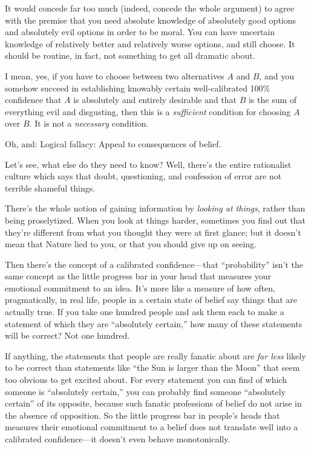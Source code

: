 {
 It would concede far too much (indeed, concede the whole argument)
to agree with the premise that you need absolute knowledge of
absolutely good options and absolutely evil options in order to be
moral. You can have uncertain knowledge of relatively better and
relatively worse options, and still choose. It should be routine, in
fact, not something to get all dramatic about.}

{
 I mean, yes, if you have to choose between two alternatives $A$ and
$B$, and you somehow succeed in establishing knowably certain
well-calibrated 100\% confidence that $A$ is absolutely and entirely
desirable and that $B$ is the sum of everything evil and disgusting, then
this is a \textit{sufficient} condition for choosing $A$ over $B$. It is
not a \textit{necessary} condition.}

{
 Oh, and: Logical fallacy: Appeal to consequences of belief.}

{
 Let's see, what else do they need to know? Well,
there's the entire rationalist culture which says that
doubt, questioning, and confession of error are not terrible shameful
things.}

{
 There's the whole notion of gaining information by
\textit{looking at things}, rather than being proselytized. When you
look at things harder, sometimes you find out that
they're different from what you thought they were at
first glance; but it doesn't mean that Nature lied to
you, or that you should give up on seeing.}

{
 Then there's the concept of a calibrated
confidence---that ``probability''
isn't the same concept as the little progress bar in
your head that measures your emotional commitment to an idea.
It's more like a measure of how often, pragmatically,
in real life, people in a certain state of belief say things that are
actually true. If you take one hundred people and ask them each to make
a statement of which they are ``absolutely
certain,'' how many of these statements will be
correct? Not one hundred.}

{
 If anything, the statements that people are really fanatic about
are \textit{far less} likely to be correct than statements like
``the Sun is larger than the Moon''
that seem too obvious to get excited about. For every statement you can
find of which someone is ``absolutely
certain,'' you can probably find someone
``absolutely certain'' of its
opposite, because such fanatic professions of belief do not arise in
the absence of opposition. So the little progress bar in
people's heads that measures their emotional commitment
to a belief does not translate well into a calibrated confidence---it
doesn't even behave monotonically.}

